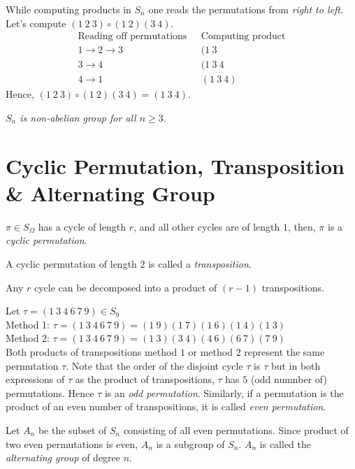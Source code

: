 \begin{eg}
    While computing products in $S_n$ one reads the permutations from \textit{right to left}. Let's compute $(1 \ 2 \ 3) \circ (1 \ 2)(3 \ 4)$.
    \begin{align*}
        \text{Reading off permutations} & \ \ \ \text{Computing product}\\
        1 \rightarrow 2 \rightarrow 3 & \ \ \ (1 \ 3\\
        3 \rightarrow 4 & \ \ \ (1 \ 3 \ 4\\
        4 \rightarrow 1 & \ \ \ (1 \ 3 \ 4)
    \end{align*}
    Hence, $(1 \ 2 \ 3) \circ (1 \ 2)(3 \ 4) = (1 \ 3 \ 4).$
\end{eg}
\textit{$S_n$ is non-abelian group for all $n \ge 3$.}
\section{Cyclic Permutation, Transposition \& Alternating Group}
\begin{definition}
    $\pi \in S_\Omega$ has a cycle of length $r$, and all other cycles are of length $1$, then, $\pi$ is a \textit{cyclic permutation}.
\end{definition}
\begin{definition}[Transposition]
    A cyclic permutation of length $2$ is called a \textit{transposition}.
\end{definition}
\begin{prop}
    Any $r$ cycle can be decomposed into a product of $(r-1)$ transpositions.
\end{prop}
\begin{eg}
    Let $\tau = (1 \ 3 \ 4 \ 6 \ 7 \ 9) \in S_9$\\
    Method 1: $\tau = (1 \ 3 \ 4 \ 6 \ 7 \ 9) = (1 \ 9)(1 \ 7)(1 \ 6)(1 \ 4)(1 \ 3)$\\
    Method 2: $\tau = (1 \ 3 \ 4 \ 6 \ 7 \ 9) = (1 \ 3)(3 \ 4)(4 \ 6)(6 \ 7)(7 \ 9)$\\
    Both products of transpositions method $1$ or method $2$ represent the same permutation $\tau$. Note that the order of the disjoint cycle $\tau$ is $\tau$ but in both expressions of $\tau$ as the product of transpositions, $\tau$ has $5$ (odd numnber of) permutations.  Hence $\tau$ is an \textit{odd permutation}. Similarly, if a permutation is the product of an even number of transpositions, it is called \textit{even permutation}.
\end{eg}
\begin{definition}
    Let $A_n$ be the subset of $S_n$ consisting of all even permutations. Since product of two even permutations is even, $A_n$ is a subgroup of $S_n$. $A_n$ is called the \textit{alternating group} of degree $n$.
\end{definition}